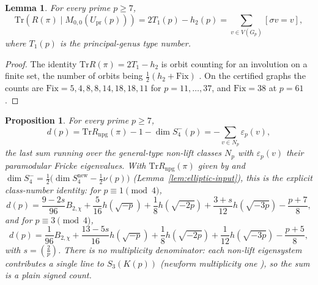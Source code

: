 \documentclass[11pt]{amsart}
\theoremstyle{plain}
\newtheorem{proposition}[theorem]{Proposition}
\newtheorem{lemma}[theorem]{Lemma}
\theoremstyle{definition}
\newcommand{\Tr}{\mathrm{Tr}}
\newcommand{\Upr}{U_{\mathrm{pr}}}
\newcommand{\snew}{S^{\mathrm{new}}}
\newcommand{\eps}{\varepsilon}
\providecommand{\kro}[2]{\left(\frac{#1}{#2}\right)}
\providecommand{\Upr}{U_{\mathrm{pr}}}
\providecommand{\snew}{S^{\mathrm{new}}}
\begin{document}
	\begin{lemma}\label{lem:fixed-point-trace}
		For every prime $p\ge7$,
		\begin{equation}\label{eq:fixtrace}
			\Tr\!\left(R(\pi)\mid M_{0,0}(\Upr(p))\right)
			=2T_1(p)-h_2(p)
			=\sum_{v\in V(G_p)}[\sigma v=v],
		\end{equation}
		where $T_1(p)$ is the principal-genus type number.
	\end{lemma}
	
	\begin{proof}
		The identity $\Tr R(\pi)=2T_1-h_2$ is orbit counting for an involution on
		a finite set, the number of orbits being $\frac12(h_2+\mathrm{Fix})$
		\cite[Thm.~2]{IbukiyamaKatsura}. On the certified graphs the counts are
		$\mathrm{Fix}=5,4,8,8,14,18,18,11$ for $p=11,\dots,37$, and
		$\mathrm{Fix}=38$ at $p=61$.
	\end{proof}
	
	\begin{proposition}	\label{prop:exactmass}
		For every prime $p\ge7$,
		\begin{equation}\label{eq:exactmass}
			d(p)=\Tr R_{\mathrm{npg}}(\pi)-1-\dim S_4^-(p)
			=-\!\!\sum_{v\in N_p}\!\!\eps_p(v),
		\end{equation}
		the last sum running over the general-type non-lift classes $N_p$ with
		$\eps_p(v)$ their paramodular Fricke eigenvalues. With
		$\Tr R_{\mathrm{npg}}(\pi)$ given by
		\cite[Thm.~5.2]{Ibukiyama2019quinary} and
		$\dim S_4^-=\tfrac12\bigl(\dim\snew_4-\tfrac12\nu(p)\bigr)$
		(Lemma~\ref{lem:elliptic-input}), this is the explicit class-number
		identity: for $p\equiv1\pmod4$,
		\[
		d(p)=\frac{9-2s}{96}B_{2,\chi}
		+\frac{5}{16}h(\sqrt{-p})
		+\frac18h(\sqrt{-2p})
		+\frac{3+s}{12}h(\sqrt{-3p})
		-\frac{p+7}{8},
		\]
		and for $p\equiv3\pmod4$,
		\[
		d(p)=\frac{1}{96}B_{2,\chi}
		+\frac{13-5s}{16}h(\sqrt{-p})
		+\frac18h(\sqrt{-2p})
		+\frac1{12}h(\sqrt{-3p})
		-\frac{p+5}{8},
		\]
		with $s=\kro{2}{p}$. There is no multiplicity denominator: each non-lift eigensystem contributes a single line to $S_3(K(p))$ (newform multiplicity one \cite[Prop.~10.1]{RoesnerWeissauer2021}), so the sum is a plain signed count.
	\end{proposition}
	
\end{document}
